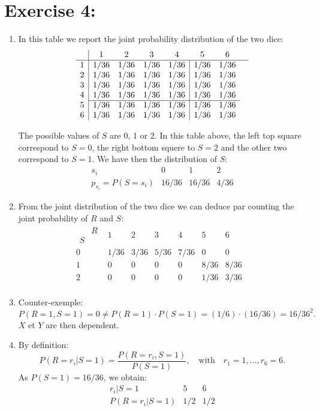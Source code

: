\documentclass[12pt,thmsa]{article}\usepackage[]{graphicx}\usepackage[]{color}
\begin{document}
\section*{Exercise 4:}
\begin{enumerate}%
\item In this table we report the joint probability distribution of the two dice:
$$
\begin{array}{c|ccccccc}
 & 1 & 2 & 3 & 4 & 5 & 6 & \\
\hline
1 & 1/36 & 1/36 & 1/36 & \multicolumn{1}{c|}{1/36} & 1/36 & 1/36 \\
2 & 1/36 & 1/36 & 1/36 & \multicolumn{1}{c|}{1/36} & 1/36 & 1/36 \\
3 & 1/36 & 1/36 & 1/36 & \multicolumn{1}{c|}{1/36} & 1/36 & 1/36 \\
4 & 1/36 & 1/36 & 1/36 & \multicolumn{1}{c|}{1/36} & 1/36 & 1/36 \\
\cline{2-7}
5 & 1/36 & 1/36 & 1/36 & \multicolumn{1}{c|}{1/36} & 1/36 & 1/36 \\
6 & 1/36 & 1/36 & 1/36 & \multicolumn{1}{c|}{1/36} & 1/36 & 1/36 \\
\end{array}
$$

The possible values of $S$ are 0, 1 or 2. In this table above, the left top square correspond to $S=0$, the right bottom squere to $S=2$ and the other two correspond to $S=1$.
We have then the distribution of $S$:
$$
\begin{array}{c|ccc}
s_i & 0 & 1 & 2\\
\hline
p_{s_i}  = P(S=s_i) & 16/36 & 16/36 & 4/36
\end{array}
$$

\item From the joint distribution of the two dice we can deduce par counting the joint probability of $R$ and $S$:
$$
\begin{array}{c|ccccccc}
\begin{array}{cc}
&R\\
S&
\end{array} & 1 & 2 & 3 & 4 & 5 & 6 & \\
\hline
0 & 1/36 & 3/36 & 5/36 & 7/36 & 0 & 0 \\
1 & 0 & 0 & 0 & 0 & 8/36 & 8/36 \\
2 & 0 & 0 & 0 & 0 & 1/36 & 3/36 \\
\end{array}
$$
\smallskip

\item Counter-exemple: $P(R=1, S=1) = 0 \neq P(R=1)\cdot P(S=1) = (1/6)\cdot(16/36)=16/36^2.$
$X$ et $Y$ are then dependent.
\smallskip

\item By definition:
$$
P(R=r_i | S=1) = \frac{P(R=r_i, S=1)}{P(S=1)}, \quad \mbox{with}\quad r_1=1,\ldots,r_6=6.
$$
As $P(S=1) = 16/36$, we obtain:
$$
\begin{array}{c|ccc}
r_i|S=1 & 5 & 6\\
\hline
P(R=r_i|S=1) & 1/2 & 1/2
\end{array}
$$
\end{enumerate}
\end{document}
